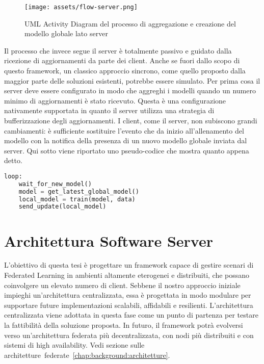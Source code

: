 \documentclass[a4paper, oneside, openright]{report}
\let\oldsection\section
\renewcommand{\section}{\newpage\oldsection}
\begin{document}
\begin{figure}[h] \label{fig:flow-server}
\centering
\texttt{[image: assets/flow-server.png]}
\caption{UML Activity Diagram del processo di aggregazione e creazione del modello globale lato server}\label{fig:flow-server}
\end{figure}

Il processo che invece segue il server è totalmente passivo e guidato dalla ricezione di aggiornamenti da parte dei client. 
Anche se fuori dallo scopo di questo framework, un classico approccio sincrono, come quello proposto dalla maggior parte delle soluzioni esistenti, potrebbe essere simulato. Per prima cosa il server deve essere configurato in modo che aggreghi i modelli quando un numero minimo di aggiornamenti è stato ricevuto. Questa è una configurazione nativamente supportata in quanto il server utilizza una strategia di bufferizzazione degli aggiornamenti. I client, come il server, non subiscono grandi cambiamenti: è sufficiente sostituire l'evento che da inizio all'allenamento del modello con la notifica della presenza di un nuovo modello globale inviata dal server. Qui sotto viene riportato uno pseudo-codice che mostra quanto appena detto.
\begin{lstlisting}[language=Python]
loop:
    wait_for_new_model()
    model = get_latest_global_model()
    local_model = train(model, data)
    send_update(local_model)
\end{lstlisting} 
\newpage
\section{Architettura Software Server}
L'obiettivo di questa tesi è progettare un framework capace di gestire scenari di Federated Learning in ambienti altamente eterogenei e distribuiti, che possano coinvolgere un elevato numero di client. Sebbene il nostro approccio iniziale impieghi un'architettura centralizzata, essa è progettata in modo modulare per supportare future implementazioni scalabili, affidabili e resilienti. L'architettura centralizzata viene adottata in questa fase come un punto di partenza per testare la fattibilità della soluzione proposta. In futuro, il framework potrà evolversi verso un'architettura federata più decentralizzata, con nodi più distribuiti e con sistemi di high availability. Vedi sezione sulle architetture~federate~\ref{chap:background:architetture}.
\end{document}
